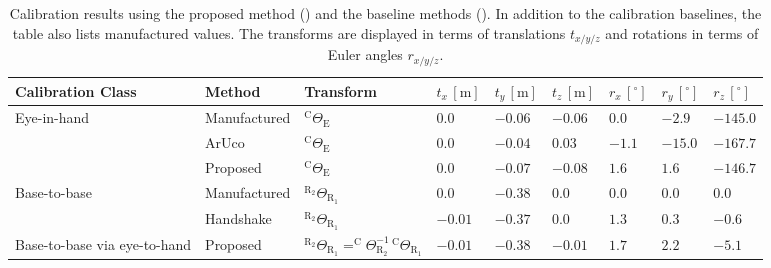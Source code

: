 
\begin{landscape}
\begin{table}[]
\caption{Calibration results using the proposed method () and the baseline methods (). In addition to the calibration baselines, the table also lists manufactured values. The transforms are displayed in terms of translations $t_{x/y/z}$ and rotations in terms of Euler angles $r_{x/y/z}$.}
\label{c1:tab:calibration_results}
\centering
\begin{tabular}{|l|l|l|l|l|l|l|l|l|}
\hline
Calibration Class             & Method       & Transform                                                                                                        & $t_x\,[\text{m}]$ & $t_y\,[\text{m}]$ & $t_z\,[\text{m}]$ & $r_x\,[^\circ]$ & $r_y\,[^\circ]$ & $r_z\,[^\circ]$ \\ \hline
\multirow{3}{*}{Eye-in-hand}  & Manufactured & $^\text{C}\Theta_\text{E}$                                                                                  & $ 0.0$            & $-0.06$           & $-0.06$           & $ 0.0$          & $-2.9$          & $-145.0$        \\ \cline{2-9} 
                              & ArUco        & $^\text{C}\Theta_\text{E}$                                                                                  & $ 0.0$            & $-0.04$           & $ 0.03$           & $-1.1$          & $-15.0$         & $-167.7$        \\ \cline{2-9} 
                              & Proposed     & $^\text{C}\Theta_\text{E}$                                                                                  & $ 0.0$            & $-0.07$           & $-0.08$           & $ 1.6$          & $ 1.6$          & $-146.7$        \\ \hline
\multirow{2}{*}{Base-to-base} & Manufactured & $^{\text{R}_2}\Theta_{\text{R}_1}$                                                                           & $ 0.0$            & $-0.38$           & $ 0.0$            & $0.0$           & $0.0$           & $ 0.0$          \\ \cline{2-9}
                              & Handshake    & $^{\text{R}_2}\Theta_{\text{R}_1}$                                                                           & $-0.01$           & $-0.37$           & $ 0.0$            & $1.3$           & $0.3$           & $-0.6$          \\ \hline
Base-to-base via eye-to-hand  & Proposed     & $^{\text{R}_2}\Theta_{\text{R}_1} = ^\text{C}\Theta^{-1}_{\text{R}_2}\,^\text{C}\Theta_{\text{R}_1}$ & $-0.01$           & $-0.38$           & $-0.01$           & $1.7$           & $2.2$           & $-5.1$          \\ \hline
\end{tabular}
\end{table}
\end{landscape}

